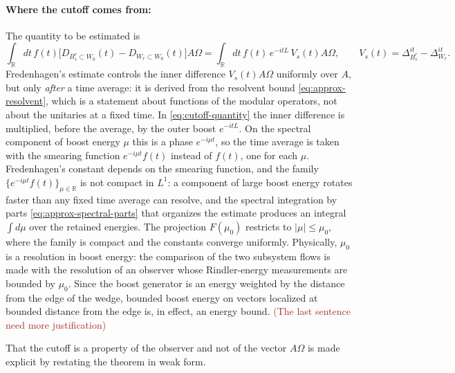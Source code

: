 \documentclass[a4paper,11pt]{article}
\theoremstyle{definition}
\newcommand{\KL}[1]{\textcolor{brown}{#1}}
\begin{document}
\paragraph{Where the cutoff comes from:}
The quantity to be estimated is
\begin{equation}
 \int_{\mathbb R}dt\,f(t)\bigl[D_{B_s^r\subset W_0}(t)-D_{W_r\subset W_0}(t)\bigr]A\Omega
 =\int_{\mathbb R}dt\,f(t)\,e^{-itL}\,V_s(t)A\Omega,\qquad V_s(t)=\Delta_{B_s^r}^{it}-\Delta_{W_r}^{it}.
 \label{eq:cutoff-quantity}
\end{equation}
Fredenhagen's estimate controls the inner difference $V_s(t)A\Omega$ uniformly over $A$, but only \emph{after} a time average: it is derived from the resolvent bound \eqref{eq:approx-resolvent}, which is a statement about functions of the modular operators, not about the unitaries at a fixed time. In \eqref{eq:cutoff-quantity} the inner difference is multiplied, before the average, by the outer boost $e^{-itL}$. On the spectral component of boost energy $\mu$ this is a phase $e^{-i\mu t}$, so the time average is taken with the smearing function $e^{-i\mu t}f(t)$ instead of $f(t)$, one for each $\mu$. Fredenhagen's constant depends on the smearing function, and the family $\{e^{-i\mu t}f(t)\}_{\mu\in\mathbb R}$ is not compact in $L^1$: a component of large boost energy rotates faster than any fixed time average can resolve, and the spectral integration by parts \eqref{eq:approx-spectral-parts} that organizes the estimate produces an integral $\int d\mu$ over the retained energies. The projection $F(\mu_0)$ restricts to $|\mu|\le\mu_0$, where the family is compact and the constants converge uniformly. Physically, $\mu_0$ is a resolution in boost energy: the comparison of the two subsystem flows is made with the resolution of an observer whose Rindler-energy measurements are bounded by $\mu_0$. Since the boost generator is an energy weighted by the distance from the edge of the wedge, bounded boost energy on vectors localized at bounded distance from the edge is, in effect, an energy bound. \KL{(The last sentence need more justification)}

That the cutoff is a property of the observer and not of the vector $A\Omega$ is made explicit by restating the theorem in weak form.
\end{document}
